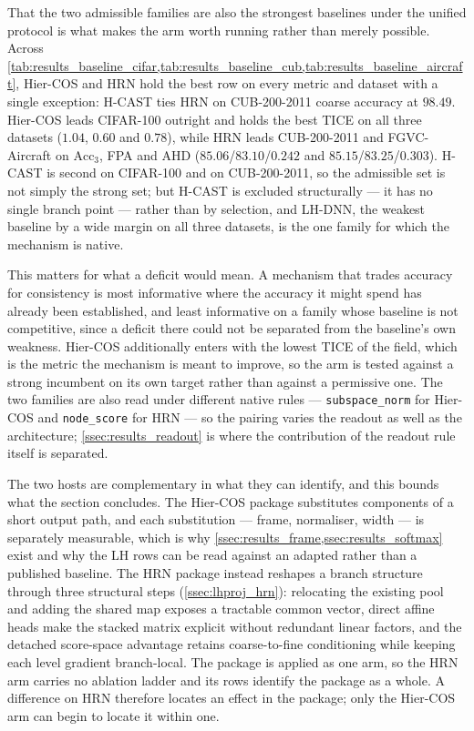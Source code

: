 That the two admissible families are also the strongest baselines under the
unified protocol is what makes the arm worth running rather than merely possible.
Across
\cref{tab:results_baseline_cifar,tab:results_baseline_cub,tab:results_baseline_aircraft},
Hier-COS and HRN hold the best row on every metric and dataset with a single
exception: H-CAST ties HRN on CUB-200-2011 coarse accuracy at $98.49$. Hier-COS
leads CIFAR-100 outright and holds the best TICE on all three datasets
($1.04$, $0.60$ and $0.78$), while HRN leads CUB-200-2011 and FGVC-Aircraft on
$\mathrm{Acc}_3$, FPA and AHD ($85.06$/$83.10$/$0.242$ and
$85.15$/$83.25$/$0.303$). H-CAST is second on CIFAR-100 and on CUB-200-2011, so
the admissible set is not simply the strong set; but H-CAST is excluded
structurally --- it has no single branch point --- rather than by selection, and
LH-DNN, the weakest baseline by a wide margin on all three datasets, is the one
family for which the mechanism is native.

This matters for what a deficit would mean. A mechanism that trades accuracy for
consistency is most informative where the accuracy it might spend has already
been established, and least informative on a family whose baseline is not
competitive, since a deficit there could not be separated from the baseline's own
weakness. Hier-COS additionally enters with the lowest TICE of the field, which
is the metric the mechanism is meant to improve, so the arm is tested against a
strong incumbent on its own target rather than against a permissive one. The two
families are also read under different native rules --- \texttt{subspace\_norm}
for Hier-COS and \texttt{node\_score} for HRN --- so the pairing varies the
readout as well as the architecture; \cref{ssec:results_readout} is where the
contribution of the readout rule itself is separated.

The two hosts are complementary in what they can identify, and this bounds what
the section concludes. The Hier-COS package substitutes components of a short
output path, and each substitution --- frame, normaliser, width --- is separately
measurable, which is why \cref{ssec:results_frame,ssec:results_softmax} exist and
why the LH rows can be read against an adapted rather than a published baseline.
The HRN package instead reshapes a branch structure through three structural
steps (\cref{ssec:lhproj_hrn}): relocating the existing pool and adding the
shared map exposes a tractable common vector, direct affine heads make the
stacked matrix explicit without redundant linear factors, and the detached
score-space advantage retains coarse-to-fine conditioning while keeping each
level gradient branch-local. The package is applied as one arm, so the
HRN arm carries no ablation ladder and its rows identify the package as a whole.
A difference on HRN therefore locates an effect in the package; only the Hier-COS
arm can begin to locate it within one.

